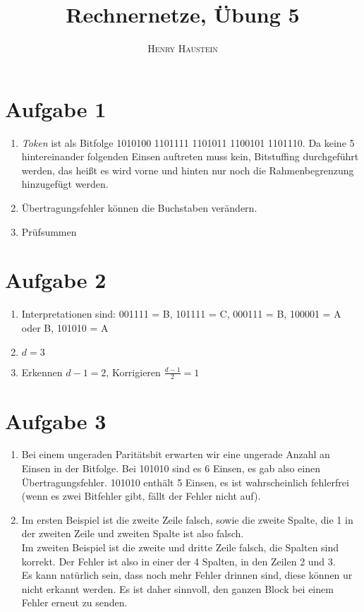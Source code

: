 \documentclass{article}
\title{\textbf{Rechnernetze, Übung 5}}
\author{\textsc{Henry Haustein}}
\date{}
\begin{document}
	\maketitle
	
	\section*{Aufgabe 1}
	\begin{enumerate}[label=(\alph*)]
		\item \textit{Token} ist als Bitfolge 1010100 1101111 1101011 1100101 1101110. Da keine 5 hintereinander folgenden Einsen auftreten muss kein, Bitstuffing durchgeführt werden, das heißt es wird vorne und hinten nur noch die Rahmenbegrenzung hinzugefügt werden.
		\item Übertragungsfehler können die Buchstaben verändern.
		\item Prüfsummen
	\end{enumerate}

	\section*{Aufgabe 2}
	\begin{enumerate}[label=(\alph*)]
		\item Interpretationen sind: 001111 = B, 101111 = C, 000111 = B, 100001 = A oder B, 101010 = A
		\item $d=3$
		\item Erkennen $d-1=2$, Korrigieren $\frac{d-1}{2}=1$
	\end{enumerate}

	\section*{Aufgabe 3}
	\begin{enumerate}[label=(\alph*)]
		\item Bei einem ungeraden Paritätsbit erwarten wir eine ungerade Anzahl an Einsen in der Bitfolge. Bei 101010 sind es 6 Einsen, es gab also einen Übertragungsfehler. 101010 enthält 5 Einsen, es ist wahrscheinlich fehlerfrei (wenn es zwei Bitfehler gibt, fällt der Fehler nicht auf).
		\item Im ersten Beispiel ist die zweite Zeile falsch, sowie die zweite Spalte, die 1 in der zweiten Zeile und zweiten Spalte ist also falsch. \\
		Im zweiten Beispiel ist die zweite und dritte Zeile falsch, die Spalten sind korrekt. Der Fehler ist also in einer der 4 Spalten, in den Zeilen 2 und 3. \\
		Es kann natürlich sein, dass noch mehr Fehler drinnen sind, diese können ur nicht erkannt werden. Es ist daher sinnvoll, den ganzen Block bei einem Fehler erneut zu senden.
	\end{enumerate}
\end{document}
